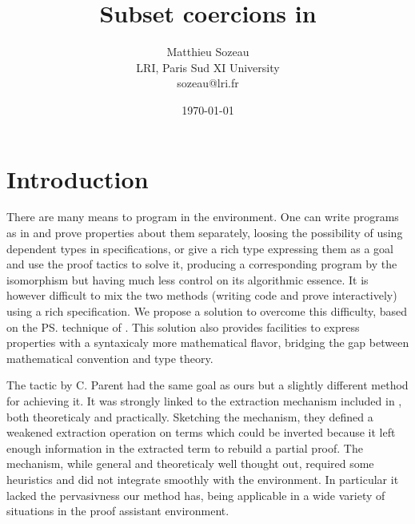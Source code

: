 \documentclass[twocolumn]{article}
\author{Matthieu Sozeau \\
  LRI, Paris Sud XI University \\
  sozeau@lri.fr}
\title{Subset coercions in \Coq}
\date{\today}
\begin{document}
\maketitle


\section{Introduction}
There are many means to program in the \Coq{} environment. One
can write programs as in \ML{} and prove properties about them
separately, loosing the possibility of using dependent types in
specifications, or give a rich type expressing them as a goal and use the
proof tactics to solve it, producing a corresponding program by the
\CurryHoward isomorphism but having much less control on its algorithmic
essence. It is however difficult to mix the two methods
(writing code and prove interactively) using a rich specification. We
propose a solution to overcome this difficulty, based on the \ps{}
\cite{Shankar&Owre:WADT99} technique of \PVS{}
\cite{PVS:Language,PVS:Semantics-TR}. This solution also provides
facilities to express properties with a syntaxicaly more mathematical flavor,
bridging the gap between mathematical convention and type theory.

The \Program{} tactic by C. Parent \cite{conf/mpc/Parent95} had the same
goal as ours but a slightly different method for achieving it. It was strongly
linked to the extraction mechanism included in \Coq, both theoreticaly
and practically. Sketching the mechanism, they defined a weakened
extraction operation on \CIC{} terms which could be inverted because it left enough
information in the extracted term to rebuild a partial proof. The
mechanism, while general and theoreticaly well thought out, required
some heuristics and did not integrate smoothly with the \Coq{}
environment. In particular it lacked the pervasivness our method has,
being applicable in a wide variety of situations in the proof assistant
environment.
\end{document}
